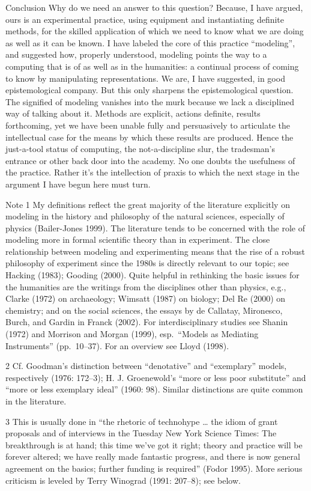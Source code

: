Conclusion Why do we need an answer to this question? Because, I have
argued, ours is an experimental practice, using equipment and
instantiating definite methods, for the skilled application of which we
need to know what we are doing as well as it can be known. I have
labeled the core of this practice ``modeling'', and suggested how,
properly understood, modeling points the way to a computing that is of
as well as in the humanities: a continual process of coming to know by
manipulating representations. We are, I have suggested, in good
epistemological company. But this only sharpens the epistemological
question. The signified of modeling vanishes into the murk because we
lack a disciplined way of talking about it. Methods are explicit,
actions definite, results forthcoming, yet we have been unable fully and
persuasively to articulate the intellectual case for the means by which
these results are produced. Hence the just-a-tool status of computing,
the not-a-discipline slur, the tradesman's entrance or other back door
into the academy. No one doubts the usefulness of the practice. Rather
it's the intellection of praxis to which the next stage in the argument
I have begun here must turn.

Note 1 My definitions reflect the great majority of the literature
explicitly on modeling in the history and philosophy of the natural
sciences, especially of physics (Bailer-Jones 1999). The literature
tends to be concerned with the role of modeling more in formal
scientific theory than in experiment. The close relationship between
modeling and experimenting means that the rise of a robust philosophy of
experiment since the 1980s is directly relevant to our topic; see
Hacking (1983); Gooding (2000). Quite helpful in rethinking the basic
issues for the humanities are the writings from the disciplines other
than physics, e.g., Clarke (1972) on archaeology; Wimsatt (1987) on
biology; Del Re (2000) on chemistry; and on the social sciences, the
essays by de Callatay, Mironesco, Burch, and Gardin in Franck (2002).
For interdisciplinary studies see Shanin (1972) and Morrison and Morgan
(1999), esp.~``Models as Mediating Instruments'' (pp.~10--37). For an
overview see Lloyd (1998).

2 Cf. Goodman's distinction between ``denotative'' and ``exemplary''
models, respectively (1976: 172--3); H. J. Groenewold's ``more or less
poor substitute'' and ``more or less exemplary ideal'' (1960: 98).
Similar distinctions are quite common in the literature.

3 This is usually done in ``the rhetoric of technohype \ldots{} the
idiom of grant proposals and of interviews in the Tuesday New York
Science Times: The breakthrough is at hand; this time we've got it
right; theory and practice will be forever altered; we have really made
fantastic progress, and there is now general agreement on the basics;
further funding is required'' (Fodor 1995). More serious criticism is
leveled by Terry Winograd (1991: 207--8); see below.


